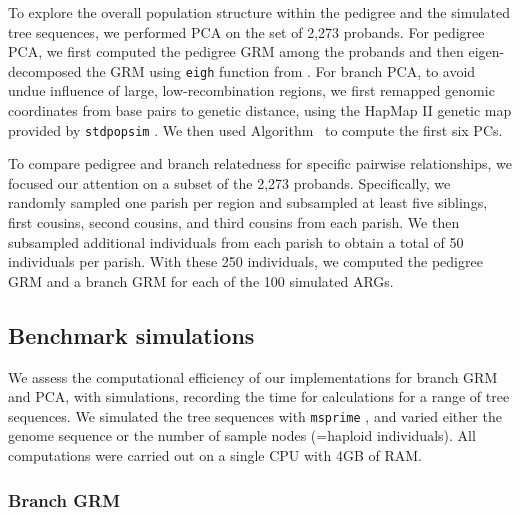To explore the overall population structure within the pedigree and the simulated tree sequences,
we performed PCA on the set of 2,273 probands.
%
For pedigree PCA, we first computed the pedigree GRM
among the probands and then eigen-decomposed the GRM using
\texttt{eigh} function from \scipy{} \citep{Virtanen2020SciPy}.
%
For branch PCA, to avoid undue influence of large, low-recombination regions,
we first remapped genomic coordinates from base pairs to genetic distance,
using the HapMap II genetic map provided by \texttt{stdpopsim} \citep{adrion2020stdpopsim}.
%
We then used Algorithm~ to compute the first six PCs.

To compare pedigree and branch relatedness for specific pairwise relationships,
we focused our attention on a subset of the 2,273 probands.
%
Specifically, we randomly sampled one parish per region and
subsampled at least five siblings, first cousins, second cousins, and third cousins from each parish.
%
We then subsampled additional individuals from each parish
to obtain a total of 50 individuals per parish.
%
With these 250 individuals, we computed the pedigree GRM and a branch GRM
for each of the 100 simulated ARGs.

%



\subsection{Benchmark simulations}

We assess the computational efficiency of our implementations for branch GRM and PCA,
with simulations, recording the time for calculations for a range of tree sequences.
%
We simulated the tree sequences with \texttt{msprime} \citep{baumdicker2022efficient},
and varied either the genome sequence or the number of sample nodes (=haploid individuals).
%
All computations were carried out on a single CPU with 4GB of RAM.

\subsubsection{Branch GRM}

